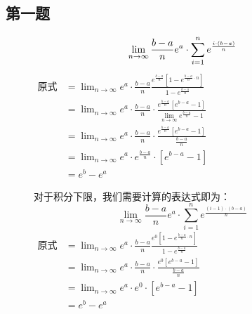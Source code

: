 \documentclass[fontset=windows]{article}
\begin{document}
    \subsection{第一题}
    \begin{figure}[!htb]
    \begin{minipage}[t]{0.5\linewidth}
    \begin{equation}
        \lim_{n\to\infty}{\frac{b-a}{n}e^a\cdot \sum_{i=1}^{n}{e^{\frac{i\cdot(b-a)}{n}}}}\nonumber \\
    \end{equation}
    $
      \begin{aligned}
        \text{原式}&=\lim_{n\to\infty}
        {
            e^a\cdot\frac{b-a}{n}\frac{e^{\frac{b-a}{n}}[1-e^{\frac{b-a}{n}\cdot n}]}{1-e^{\frac{b-a}{n}}}
        }\nonumber\\
        &=\lim_{n\to\infty}
        {
            e^a\cdot\frac{b-a}{n}\cdot\frac{e^{ \frac{b-a}{n} }[e^{b-a}-1]}{\lim\limits_{n\to\infty}{   e^{  \frac{b-a}{n} }   }-1}
        }\nonumber\\
        &=\lim_{n\to\infty}
        {
            e^a\cdot\frac{b-a}{n}\cdot
            \frac{e^{\frac{b-a}{n}}[e^{b-a}-1]}  {\frac{b-a}{n}}
        }\nonumber\\
        &=\lim_{n\to\infty}
        {
            e^a\cdot e^{\frac{b-a}{n}}\cdot[e^{b-a}-1] 
        }\nonumber\\
        &=e^b-e^a\nonumber
    \end{aligned}   
    $
    \end{minipage}
    \vline
    \begin{minipage}[t]{0.5\linewidth}
        对于积分下限，我们需要计算的表达式即为：
    \begin{equation}
        \lim_{n\to\infty}{\frac{b-a}{n}e^a\cdot \sum_{i=1}^{n}{e^{\frac{(i-1)\cdot(b-a)}{n}}}}\nonumber
    \end{equation}
    \noindent
    $
        \begin{aligned}
        \mbox{原式}
             &=\lim_{n\to\infty}
            {
                e^a\cdot\frac{b-a}{n}\frac{e^{0}[1-e^{\frac{b-a}{n}\cdot n}]}{1-e^{\frac{b-a}{n}}}
            }\nonumber\\ 
            &=\lim_{n\to\infty}
            {
                e^a\cdot\frac{b-a}{n}\cdot
                \frac{e^{0}[e^{b-a}-1]}  {\frac{b-a}{n}}
            }\nonumber\\ 
            &=\lim_{n\to\infty}
            {
                e^a\cdot e^{0}\cdot[e^{b-a}-1] 
            }\nonumber\\
            &=e^b-e^a\nonumber
        \end{aligned}
    $ 
    \end{minipage}
    \end{figure}
    
\end{document}
